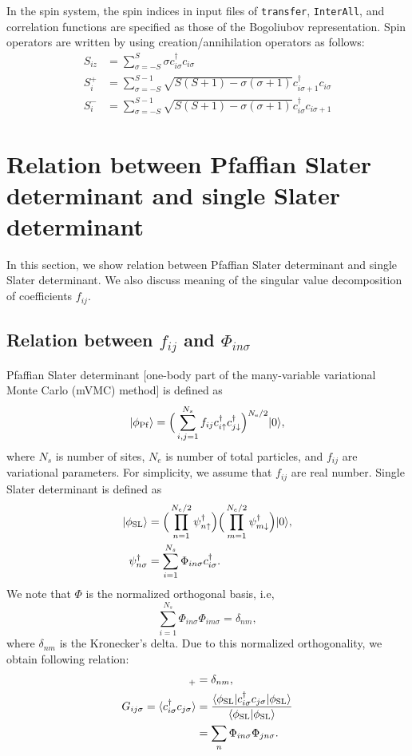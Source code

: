 In the spin system,
the spin indices in input files of \verb|transfer|, \verb|InterAll|,
and correlation functions are specified as those of the Bogoliubov representation.
Spin operators are written by using creation/annihilation operators as follows:
\begin{align}
  S_{i z} &= \sum_{\sigma = -S}^{S} \sigma c_{i \sigma}^\dagger c_{i \sigma}
  \\
  S_{i}^+ &= \sum_{\sigma = -S}^{S-1} 
  \sqrt{S(S+1) - \sigma(\sigma+1)} 
  c_{i \sigma+1}^\dagger c_{i \sigma}
  \\
  S_{i}^- &= \sum_{\sigma = -S}^{S-1} 
  \sqrt{S(S+1) - \sigma(\sigma+1)} 
  c_{i \sigma}^\dagger c_{i \sigma+1}
\end{align}

\section{Relation between Pfaffian Slater determinant and single Slater determinant}
\label{sec:PuffAndSlater}
In this section, we show relation between Pfaffian Slater determinant and single Slater determinant.
We also discuss meaning of the singular value decomposition of coefficients $f_{ij}$. 
\subsection{Relation between $f_{ij}$ and $\Phi_{in\sigma}$}
Pfaffian Slater determinant [one-body part of the many-variable variational Monte Carlo (mVMC) method]
is defined as
\begin{equation}
|\phi_{\rm Pf}\rangle=\Big(\sum_{i,j=1}^{N_{s}}f_{ij}c_{i\uparrow}^{\dagger}c_{j\downarrow}^{\dagger}\Big)^{N_{\rm e}/2}|0\rangle,
\end{equation}
where $N_{s}$ is number of sites, 
$N_{e}$ is number of total particles,
and $f_{ij}$ are variational parameters.
For simplicity, we assume that $f_{ij}$ are real number.
Single Slater determinant is defined as 
\begin{align}
|\phi_{\rm SL}\rangle&=\Big(\prod_{n=1}^{N_{e}/2}\psi_{n\uparrow}^{\dagger}\Big)
\Big(\prod_{m=1}^{N_{e}/2}\psi_{m\downarrow}^{\dagger}\Big)|0\rangle, \\
\psi_{n\sigma}^{\dagger}&=\sum_{i=1}^{N_{s}}\Phi_{in\sigma}c^{\dagger}_{i\sigma}.
\end{align}
We note that $\Phi$ is the normalized orthogonal basis, i.e, 
\begin{equation}
\sum_{i=1}^{N_{s}}\Phi_{in\sigma}\Phi_{im\sigma}=\delta_{nm},
\end{equation}
where $\delta_{nm}$ is the Kronecker's delta.
Due to this normalized orthogonality, we obtain 
following relation:
\begin{align}
[\psi^{\dagger}_{n\sigma},\psi_{m\sigma}]_{+}&=\delta_{nm},\\
G_{ij\sigma}=\langle c_{i\sigma}^{\dagger}c_{j\sigma}\rangle 
&=\frac{\langle \phi_{\rm SL}| c_{i\sigma}^{\dagger}c_{j\sigma} | \phi_{\rm SL}\rangle}{\langle \phi_{\rm SL}|\phi_{\rm SL}\rangle } \\
&=\sum_{n} \Phi_{in\sigma} \Phi_{jn\sigma}.
\end{align}

